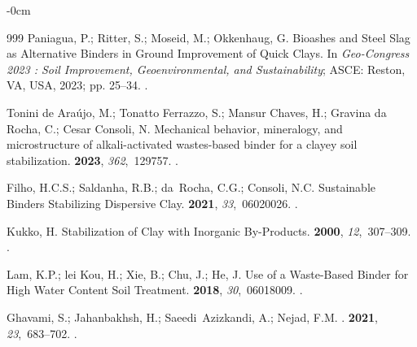 \documentclass[algorithms,article,accept,pdftex,moreauthors]{Definitions/mdpi}
\begin{document}
\begin{adjustwidth}{-\extralength}{0cm}
\begin{thebibliography}{999}
Paniagua, P.; Ritter, S.; Moseid, M.; Okkenhaug, G. Bioashes and Steel Slag as
  Alternative Binders in Ground Improvement of Quick Clays.
\newblock In {\em Geo-Congress 2023 : Soil Improvement, Geoenvironmental, and
  Sustainability}; ASCE: Reston, VA, USA, 2023; pp. 25--34. %
.

{Tonini de Araújo}, M.; {Tonatto Ferrazzo}, S.; {Mansur Chaves}, H.; {Gravina
  da Rocha}, C.; {Cesar Consoli}, N.
\newblock Mechanical behavior, mineralogy, and microstructure of
  alkali-activated wastes-based binder for a clayey soil stabilization.
 {\bf 2023}, {\em
  362},~129757.
.

Filho, H.C.S.; Saldanha, R.B.; da~Rocha, C.G.; Consoli, N.C.
\newblock Sustainable Binders Stabilizing Dispersive Clay.
 {\bf 2021}, {\em
  33},~06020026.
.

Kukko, H.
\newblock Stabilization of Clay with Inorganic By-Products.
 {\bf 2000}, {\em
  12},~307--309.
.

Lam, K.P.; lei Kou, H.; Xie, B.; Chu, J.; He, J.
\newblock Use of a Waste-Based Binder for High Water Content Soil Treatment.
 {\bf 2018}, {\em
  30},~06018009.
.

Ghavami, S.; Jahanbakhsh, H.; Saeedi~Azizkandi, A.; Nejad, F.M.
.
 {\bf 2021}, {\em
  23},~683--702.
.


\end{thebibliography}
\end{adjustwidth}
\end{document}
